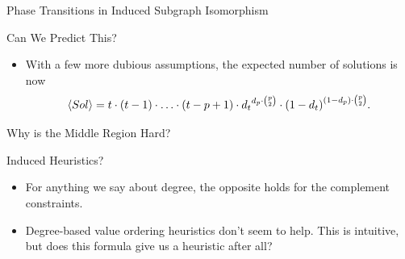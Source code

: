 \documentclass{beamer}
\begin{document}
\begin{frame}{Phase Transitions in Induced Subgraph Isomorphism}

     {
        
    }

     {
        
    }

     {
        
    }

\end{frame}

\begin{frame}{Can We Predict This?}

     {
        \begin{itemize}
            \item With a few more dubious assumptions, the expected
                number of solutions is now \[ \langle Sol \rangle = t \cdot (t - 1) \cdot \ldots
                    \cdot (t - p + 1) \cdot {d_t}^{d_p \cdot \binom{p}{2}} \cdot {(1 - d_t)}^{(1 -
                        d_p) \cdot \binom{p}{2}} \textnormal{.} \]
        \end{itemize}
    }

     {
        
    }
\end{frame}

\begin{frame}{Why is the Middle Region Hard?}

     {
        \centering
        
    }

     {
        
    }

\end{frame}

\begin{frame}{Induced Heuristics?}

     {
        \begin{itemize}
            \item For anything we say about degree, the opposite holds for the complement constraints.

            \item Degree-based value ordering heuristics don't seem to help. This is intuitive, but
                does this formula give us a heuristic after all?
        \end{itemize}
    }

     {
        
    }
\end{frame}
\end{document}
